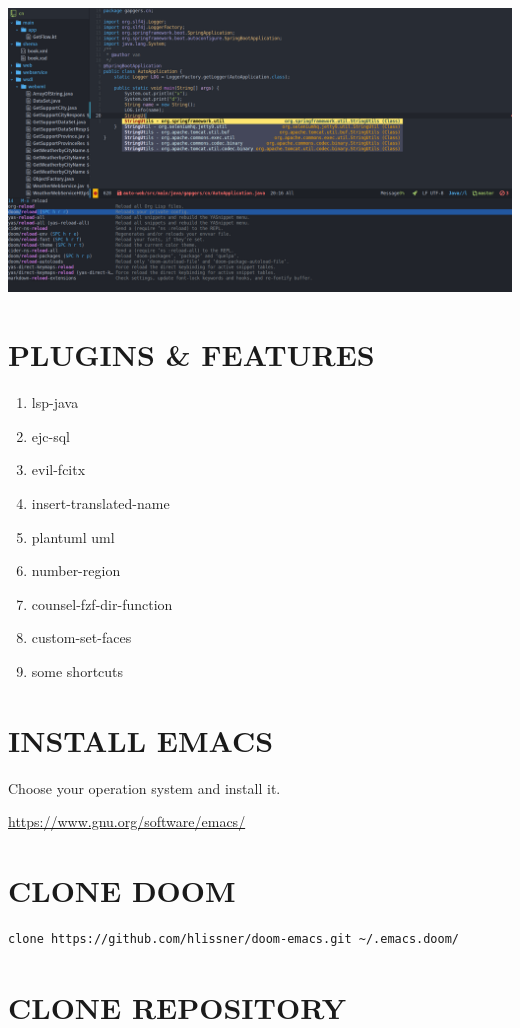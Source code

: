 \documentclass[11pt]{article}
\author{LZJ}
\date{\today}
\title{}
\begin{document}
\begin{center}
\includegraphics[width=.9\linewidth]{cut.png}
\end{center}

\section{PLUGINS \& FEATURES}
\label{sec:org3500d03}
\begin{enumerate}
\item lsp-java
\item ejc-sql
\item evil-fcitx
\item insert-translated-name
\item plantuml uml
\item number-region
\item counsel-fzf-dir-function
\item custom-set-faces
\item some shortcuts
\end{enumerate}
\section{INSTALL EMACS}
\label{sec:orgee666c2}
Choose your operation system and install it.

\url{https://www.gnu.org/software/emacs/}
\section{CLONE DOOM}
\label{sec:org0743b1e}

\begin{verbatim}
clone https://github.com/hlissner/doom-emacs.git ~/.emacs.doom/
\end{verbatim}
\section{CLONE REPOSITORY}
\label{sec:org259f84a}
\end{document}

